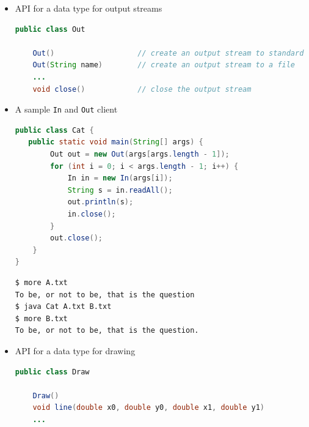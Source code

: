 \documentclass[8pt,a4paper,compress]{beamer}
\begin{document}
\begin{frame}[fragile]
\pause

\begin{itemize}
\item API for a data type for output streams
\begin{lstlisting}[language=Java]
public class Out

    Out()                   // create an output stream to standard output
    Out(String name)        // create an output stream to a file
    ...
    void close()            // close the output stream
\end{lstlisting}

\pause

\item A sample \lstinline$In$ and \lstinline$Out$ client
\begin{lstlisting}[language=Java]
public class Cat { 
   public static void main(String[] args) { 
        Out out = new Out(args[args.length - 1]);
        for (int i = 0; i < args.length - 1; i++) {
            In in = new In(args[i]);
            String s = in.readAll();
            out.println(s);
            in.close();
        }
        out.close();
    }
}
\end{lstlisting}

\pause

\begin{lstlisting}[language=bash]
$ more A.txt
To be, or not to be, that is the question
$ java Cat A.txt B.txt
$ more B.txt
To be, or not to be, that is the question.
\end{lstlisting}

\pause

\item API for a data type for drawing
\begin{lstlisting}[language=Java]
public class Draw

    Draw()
    void line(double x0, double y0, double x1, double y1)
    ...
\end{lstlisting}
\end{itemize}
\end{frame}
\end{document}
